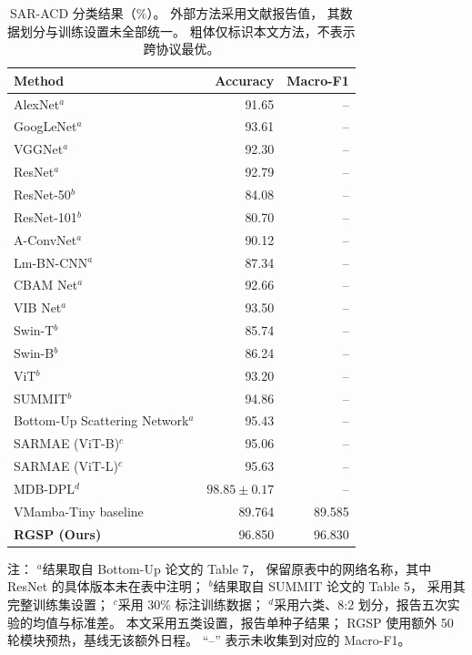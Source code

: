 \documentclass[journal]{IEEEtran}
\begin{document}
\begin{table}[!tbp]
\centering
\small
\setlength{\tabcolsep}{3pt}
\caption{SAR-ACD 分类结果（\%）。
外部方法采用文献报告值，
其数据划分与训练设置未全部统一。
粗体仅标识本文方法，不表示跨协议最优。}
\label{tab:sar_acd_comparison}

\begin{tabular}{lrr}
\toprule
Method & Accuracy & Macro-F1 \\
\midrule
AlexNet$^{a}$            & 91.65 & -- \\
GoogLeNet$^{a}$          & 93.61 & -- \\
VGGNet$^{a}$             & 92.30 & -- \\
ResNet$^{a}$             & 92.79 & -- \\
ResNet-50$^{b}$          & 84.08 & -- \\
ResNet-101$^{b}$         & 80.70 & -- \\
A-ConvNet$^{a}$          & 90.12 & -- \\
Lm-BN-CNN$^{a}$          & 87.34 & -- \\
CBAM Net$^{a}$           & 92.66 & -- \\
VIB Net$^{a}$            & 93.50 & -- \\
Swin-T$^{b}$             & 85.74 & -- \\
Swin-B$^{b}$             & 86.24 & -- \\
ViT$^{b}$                & 93.20 & -- \\
SUMMIT$^{b}$             & 94.86 & -- \\
Bottom-Up Scattering Network$^{a}$
                        & 95.43 & -- \\
SARMAE (ViT-B)$^{c}$     & 95.06 & -- \\
SARMAE (ViT-L)$^{c}$     & 95.63 & -- \\
MDB-DPL$^{d}$           & $98.85 \pm 0.17$ & -- \\
\midrule
VMamba-Tiny baseline    & 89.764 & 89.585 \\
\textbf{RGSP (Ours)}     & 96.850 & 96.830 \\
\bottomrule
\end{tabular}

\smallskip
\begin{minipage}{0.98\linewidth}
\footnotesize
注：
$^{a}$结果取自 Bottom-Up 论文的 Table 7，
保留原表中的网络名称，其中 ResNet 的具体版本未在表中注明；
$^{b}$结果取自 SUMMIT 论文的 Table 5，
采用其完整训练集设置；
$^{c}$采用 30\% 标注训练数据；
$^{d}$采用六类、8:2 划分，报告五次实验的均值与标准差。
本文采用五类设置，报告单种子结果；
RGSP 使用额外 50 轮模块预热，基线无该额外日程。
``--'' 表示未收集到对应的 Macro-F1。
\end{minipage}
\end{table}
\end{document}
